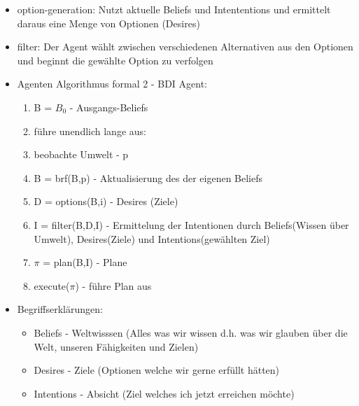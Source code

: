 \documentclass{article} %
\begin{document}
\begin{itemize}
		\item option-generation: Nutzt aktuelle Beliefs und Intententions und ermittelt daraus eine Menge von Optionen (Desires)
		\item filter: Der Agent wählt zwischen verschiedenen Alternativen aus den Optionen und beginnt die gewählte Option zu verfolgen	
		\item Agenten Algorithmus formal 2 - BDI Agent:
		\begin{enumerate}
			\item B = $B_{0}$ - Ausgangs-Beliefs
			\item führe unendlich lange aus:
			\item beobachte Umwelt - p
			\item B = brf(B,p) - Aktualisierung des der eigenen Beliefs
			\item D = options(B,i) - Desires (Ziele)
			\item I = filter(B,D,I) - Ermittelung der Intentionen durch Beliefs(Wissen über Umwelt), Desires(Ziele) und Intentions(gewählten Ziel)
			\item $\pi$ = plan(B,I) - Plane
			\item execute($\pi$) - führe Plan aus
		\end{enumerate}
		\item Begriffserklärungen:
		\begin{itemize}
			\item Beliefs - Weltwisssen (Alles was wir wissen d.h. was wir glauben über die Welt, unseren Fähigkeiten und Zielen)
			\item Desires - Ziele (Optionen welche wir gerne erfüllt hätten)
			\item Intentions - Absicht (Ziel welches ich jetzt erreichen möchte)
		\end{itemize}
	\end{itemize}
\end{document}
